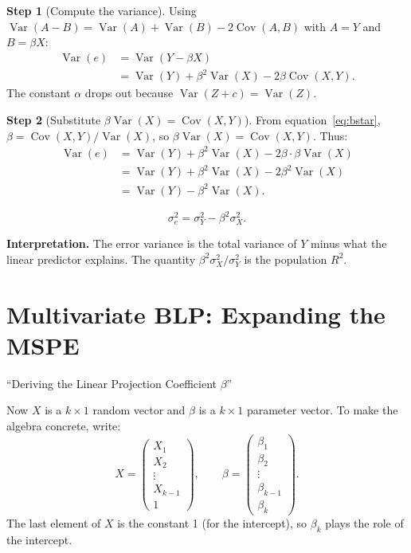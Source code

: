 \documentclass[12pt]{article}
\newcommand{\Var}{\operatorname{Var}}
\newcommand{\Cov}{\operatorname{Cov}}
\theoremstyle{definition}
\newtheorem{step}{Step}
\begin{document}
\begin{step}[Compute the variance]
Using $\Var(A - B) = \Var(A) + \Var(B) - 2\Cov(A,B)$ with $A = Y$ and $B = \beta X$:
\begin{align*}
\Var(e) &= \Var(Y - \beta X) \\
&= \Var(Y) + \beta^2\Var(X) - 2\beta\Cov(X,Y).
\end{align*}
The constant $\alpha$ drops out because $\Var(Z + c) = \Var(Z)$.
\end{step}

\begin{step}[Substitute $\beta\Var(X) = \Cov(X,Y)$]
From equation~\eqref{eq:bstar}, $\beta = \Cov(X,Y)/\Var(X)$, so $\beta\Var(X) = \Cov(X,Y)$. Thus:
\begin{align*}
\Var(e) &= \Var(Y) + \beta^2\Var(X) - 2\beta \cdot \beta\Var(X)\\
&= \Var(Y) + \beta^2\Var(X) - 2\beta^2\Var(X)\\
&= \Var(Y) - \beta^2\Var(X).
\end{align*}
\end{step}

\begin{equation}
\boxed{\sigma_e^2 = \sigma_Y^2 - \beta^2\sigma_X^2.}
\end{equation}

\textbf{Interpretation.}  The error variance is the total variance of $Y$ minus what the linear predictor explains.  The quantity $\beta^2\sigma_X^2 / \sigma_Y^2$ is the population $R^2$.

\section{Multivariate BLP: Expanding the MSPE}
\label{sec:multivariate}

\begin{tcolorbox}[colback=blue!5, colframe=blue!50, title=Slide Reference]
``Deriving the Linear Projection Coefficient $\beta$''
\end{tcolorbox}

Now $X$ is a $k \times 1$ random vector and $\beta$ is a $k \times 1$ parameter vector. To make the algebra concrete, write:
\[
X = \begin{pmatrix} X_1 \\ X_2 \\ \vdots \\ X_{k-1} \\ 1 \end{pmatrix}, \qquad
\beta = \begin{pmatrix} \beta_1 \\ \beta_2 \\ \vdots \\ \beta_{k-1} \\ \beta_k \end{pmatrix}.
\]
The last element of $X$ is the constant 1 (for the intercept), so $\beta_k$ plays the role of the intercept.
\end{document}
